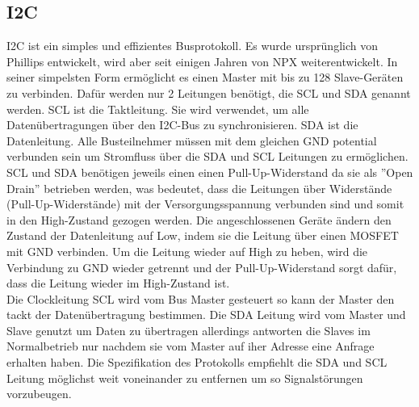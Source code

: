 \subsection{I2C}
I2C ist ein simples und effizientes Busprotokoll.
Es wurde ursprünglich von Phillips entwickelt, wird aber seit einigen Jahren von NPX weiterentwickelt.
In seiner simpelsten Form ermöglicht es einen Master mit bis zu 128 Slave-Geräten zu verbinden.
Dafür werden nur 2 Leitungen benötigt, die SCL und SDA genannt werden. SCL ist die Taktleitung. Sie wird verwendet, um alle Datenübertragungen über den I2C-Bus zu synchronisieren. SDA ist die Datenleitung.
Alle Busteilnehmer müssen mit dem gleichen GND potential verbunden sein um Stromfluss über die SDA und SCL Leitungen zu ermöglichen\cite{i2b-bus_org}.\\
SCL und SDA benötigen jeweils einen einen Pull-Up-Widerstand da sie als ”Open Drain” betrieben werden, was bedeutet, dass die Leitungen über Widerstände (Pull-Up-Widerstände) mit der Versorgungsspannung verbunden sind und somit in den High-Zustand gezogen werden.
Die angeschlossenen Geräte ändern den Zustand der Datenleitung auf Low, indem sie die Leitung über einen MOSFET mit GND verbinden.
Um die Leitung wieder auf High zu heben, wird die Verbindung zu GND wieder getrennt und der Pull-Up-Widerstand sorgt dafür, dass die Leitung wieder im High-Zustand ist.\\
Die Clockleitung SCL wird vom Bus Master gesteuert so kann der Master den tackt der Datenübertragung bestimmen.
Die SDA Leitung wird vom Master und Slave genutzt um Daten zu übertragen allerdings antworten die Slaves im Normalbetrieb nur nachdem sie vom Master auf iher Adresse eine Anfrage erhalten haben. 
Die Spezifikation des Protokolls\cite{nxp_com} empfiehlt die SDA und SCL Leitung möglichst weit voneinander zu entfernen um so Signalstörungen vorzubeugen.


